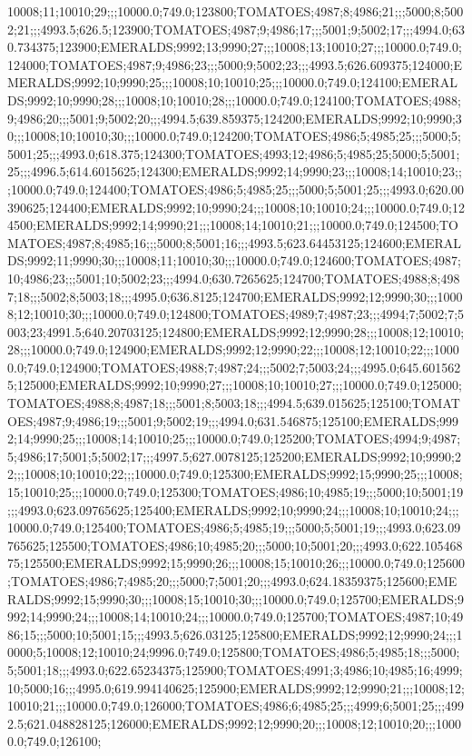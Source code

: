 10008;11;10010;29;;;10000.0;749.0;123800;TOMATOES;4987;8;4986;21;;;5000;8;5002;21;;;4993.5;626.5;123900;TOMATOES;4987;9;4986;17;;;5001;9;5002;17;;;4994.0;630.734375;123900;EMERALDS;9992;13;9990;27;;;10008;13;10010;27;;;10000.0;749.0;124000;TOMATOES;4987;9;4986;23;;;5000;9;5002;23;;;4993.5;626.609375;124000;EMERALDS;9992;10;9990;25;;;10008;10;10010;25;;;10000.0;749.0;124100;EMERALDS;9992;10;9990;28;;;10008;10;10010;28;;;10000.0;749.0;124100;TOMATOES;4988;9;4986;20;;;5001;9;5002;20;;;4994.5;639.859375;124200;EMERALDS;9992;10;9990;30;;;10008;10;10010;30;;;10000.0;749.0;124200;TOMATOES;4986;5;4985;25;;;5000;5;5001;25;;;4993.0;618.375;124300;TOMATOES;4993;12;4986;5;4985;25;5000;5;5001;25;;;4996.5;614.6015625;124300;EMERALDS;9992;14;9990;23;;;10008;14;10010;23;;;10000.0;749.0;124400;TOMATOES;4986;5;4985;25;;;5000;5;5001;25;;;4993.0;620.00390625;124400;EMERALDS;9992;10;9990;24;;;10008;10;10010;24;;;10000.0;749.0;124500;EMERALDS;9992;14;9990;21;;;10008;14;10010;21;;;10000.0;749.0;124500;TOMATOES;4987;8;4985;16;;;5000;8;5001;16;;;4993.5;623.64453125;124600;EMERALDS;9992;11;9990;30;;;10008;11;10010;30;;;10000.0;749.0;124600;TOMATOES;4987;10;4986;23;;;5001;10;5002;23;;;4994.0;630.7265625;124700;TOMATOES;4988;8;4987;18;;;5002;8;5003;18;;;4995.0;636.8125;124700;EMERALDS;9992;12;9990;30;;;10008;12;10010;30;;;10000.0;749.0;124800;TOMATOES;4989;7;4987;23;;;4994;7;5002;7;5003;23;4991.5;640.20703125;124800;EMERALDS;9992;12;9990;28;;;10008;12;10010;28;;;10000.0;749.0;124900;EMERALDS;9992;12;9990;22;;;10008;12;10010;22;;;10000.0;749.0;124900;TOMATOES;4988;7;4987;24;;;5002;7;5003;24;;;4995.0;645.6015625;125000;EMERALDS;9992;10;9990;27;;;10008;10;10010;27;;;10000.0;749.0;125000;TOMATOES;4988;8;4987;18;;;5001;8;5003;18;;;4994.5;639.015625;125100;TOMATOES;4987;9;4986;19;;;5001;9;5002;19;;;4994.0;631.546875;125100;EMERALDS;9992;14;9990;25;;;10008;14;10010;25;;;10000.0;749.0;125200;TOMATOES;4994;9;4987;5;4986;17;5001;5;5002;17;;;4997.5;627.0078125;125200;EMERALDS;9992;10;9990;22;;;10008;10;10010;22;;;10000.0;749.0;125300;EMERALDS;9992;15;9990;25;;;10008;15;10010;25;;;10000.0;749.0;125300;TOMATOES;4986;10;4985;19;;;5000;10;5001;19;;;4993.0;623.09765625;125400;EMERALDS;9992;10;9990;24;;;10008;10;10010;24;;;10000.0;749.0;125400;TOMATOES;4986;5;4985;19;;;5000;5;5001;19;;;4993.0;623.09765625;125500;TOMATOES;4986;10;4985;20;;;5000;10;5001;20;;;4993.0;622.10546875;125500;EMERALDS;9992;15;9990;26;;;10008;15;10010;26;;;10000.0;749.0;125600;TOMATOES;4986;7;4985;20;;;5000;7;5001;20;;;4993.0;624.18359375;125600;EMERALDS;9992;15;9990;30;;;10008;15;10010;30;;;10000.0;749.0;125700;EMERALDS;9992;14;9990;24;;;10008;14;10010;24;;;10000.0;749.0;125700;TOMATOES;4987;10;4986;15;;;5000;10;5001;15;;;4993.5;626.03125;125800;EMERALDS;9992;12;9990;24;;;10000;5;10008;12;10010;24;9996.0;749.0;125800;TOMATOES;4986;5;4985;18;;;5000;5;5001;18;;;4993.0;622.65234375;125900;TOMATOES;4991;3;4986;10;4985;16;4999;10;5000;16;;;4995.0;619.994140625;125900;EMERALDS;9992;12;9990;21;;;10008;12;10010;21;;;10000.0;749.0;126000;TOMATOES;4986;6;4985;25;;;4999;6;5001;25;;;4992.5;621.048828125;126000;EMERALDS;9992;12;9990;20;;;10008;12;10010;20;;;10000.0;749.0;126100;